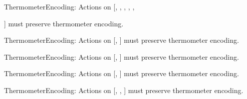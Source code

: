 \begin{constraints}
\item ThermometerEncoding: Actions on [, , , , , 

] must preserve thermometer encoding.
\item ThermometerEncoding: Actions on [, ] must preserve thermometer encoding.
\item ThermometerEncoding: Actions on [, ] must preserve thermometer encoding.
\item ThermometerEncoding: Actions on [, ] must preserve thermometer encoding.
\item ThermometerEncoding: Actions on [, , ] must preserve thermometer encoding.
\end{constraints}